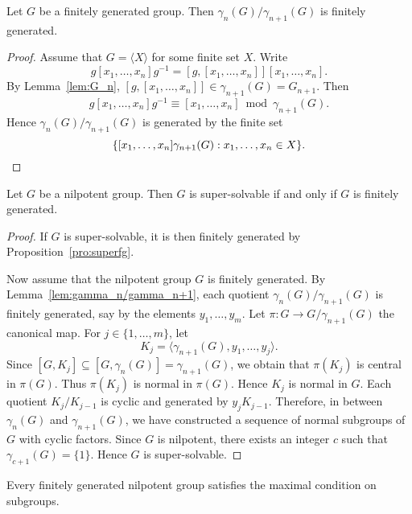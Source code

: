 \begin{lemma}
	\label{lem:gamma_n/gamma_n+1}
	Let $G$ be a finitely generated group. Then 
 	$\gamma_n(G)/\gamma_{n+1}(G)$ is finitely generated. 
\end{lemma}

\begin{proof}
	Assume that $G=\langle X\rangle$ for some finite set $X$. Write 
	\[
	g[x_1,\dots,x_n]g^{-1}=[g,[x_1,\dots,x_n]][x_1,\dots,x_n]. 
	\]
	By Lemma~\ref{lem:G_n}, 
    $[g,[x_1,\dots,x_n]]\in \gamma_{n+1}(G)=G_{n+1}$. Then 
	\[
	g[x_1,\dots,x_n]g^{-1}\equiv [x_1,\dots,x_n]\bmod \gamma_{n+1}(G). 
	\]
	Hence $\gamma_{n}(G)/\gamma_{n+1}(G)$ is generated by the finite set 
	\[
	\{[x_1,\dots,x_n]\gamma_{n+1}(G):x_1,\dots,x_n\in X\}. \qedhere 
	\]
\end{proof}

\begin{theorem}
    \label{thm:super=fg}
    Let $G$ be a nilpotent group. Then $G$ is super-solvable if and only if 
    $G$ is finitely generated. 
\end{theorem}

\begin{proof}
    If $G$ is super-solvable, it is then finitely generated by 
    Proposition~\ref{pro:superfg}.  
    
    Now assume that the nilpotent group $G$ is finitely generated. By Lemma~\ref{lem:gamma_n/gamma_n+1}, 
    each quotient $\gamma_{n}(G)/\gamma_{n+1}(G)$ is finitely generated, say by 
    the elements $y_1,\dots,y_m$. Let $\pi\colon G\to G/\gamma_{n+1}(G)$ the canonical map. 
    For $j\in\{1,\dots,m\}$, let 
    \[
    K_j=\langle \gamma_{n+1}(G),y_1,\dots,y_j\rangle.
    \]
    Since $[G,K_j]\subseteq [G,\gamma_n(G)]=\gamma_{n+1}(G)$, 
    we obtain that $\pi(K_j)$ is central in $\pi(G)$. Thus $\pi(K_j)$ is normal
    in $\pi(G)$. Hence $K_j$ is normal in $G$. Each quotient $K_j/K_{j-1}$
    is cyclic and generated by $y_jK_{j-1}$. Therefore, in between $\gamma_n(G)$ and 
    $\gamma_{n+1}(G)$, we have constructed a sequence of normal subgroups of $G$ 
    with cyclic factors. Since $G$ is nilpotent, there exists an integer $c$ such that 
    $\gamma_{c+1}(G)=\{1\}$. Hence $G$ is super-solvable. 
\end{proof}

\begin{corollary}
	\label{cor:nilpotente=>max}
    Every finitely generated nilpotent group satisfies the maximal condition on subgroups. 
\end{corollary}

